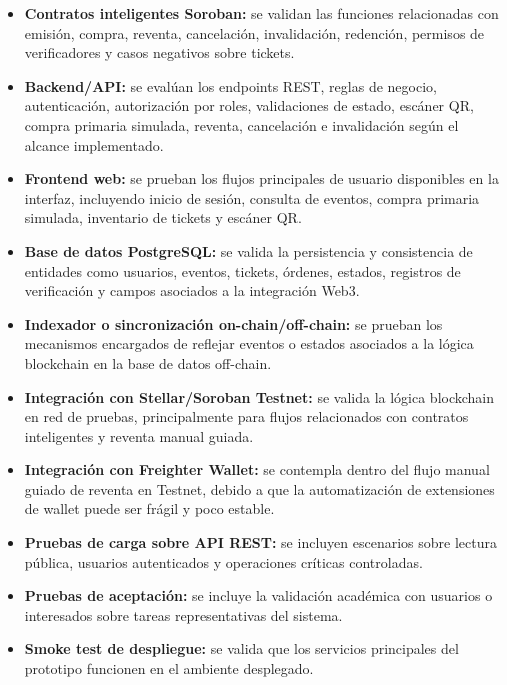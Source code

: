 \documentclass[12pt,letterpaper]{article}
\begin{document}
\begin{itemize}
    \item \textbf{Contratos inteligentes Soroban:} se validan las funciones relacionadas con emisión, compra, reventa, cancelación, invalidación, redención, permisos de verificadores y casos negativos sobre tickets.

    \item \textbf{Backend/API:} se evalúan los endpoints REST, reglas de negocio, autenticación, autorización por roles, validaciones de estado, escáner QR, compra primaria simulada, reventa, cancelación e invalidación según el alcance implementado.

    \item \textbf{Frontend web:} se prueban los flujos principales de usuario disponibles en la interfaz, incluyendo inicio de sesión, consulta de eventos, compra primaria simulada, inventario de tickets y escáner QR.

    \item \textbf{Base de datos PostgreSQL:} se valida la persistencia y consistencia de entidades como usuarios, eventos, tickets, órdenes, estados, registros de verificación y campos asociados a la integración Web3.

    \item \textbf{Indexador o sincronización on-chain/off-chain:} se prueban los mecanismos encargados de reflejar eventos o estados asociados a la lógica blockchain en la base de datos off-chain.

    \item \textbf{Integración con Stellar/Soroban Testnet:} se valida la lógica blockchain en red de pruebas, principalmente para flujos relacionados con contratos inteligentes y reventa manual guiada.

    \item \textbf{Integración con Freighter Wallet:} se contempla dentro del flujo manual guiado de reventa en Testnet, debido a que la automatización de extensiones de wallet puede ser frágil y poco estable.

    \item \textbf{Pruebas de carga sobre API REST:} se incluyen escenarios sobre lectura pública, usuarios autenticados y operaciones críticas controladas.

    \item \textbf{Pruebas de aceptación:} se incluye la validación académica con usuarios o interesados sobre tareas representativas del sistema.

    \item \textbf{Smoke test de despliegue:} se valida que los servicios principales del prototipo funcionen en el ambiente desplegado.
\end{itemize}
\end{document}
